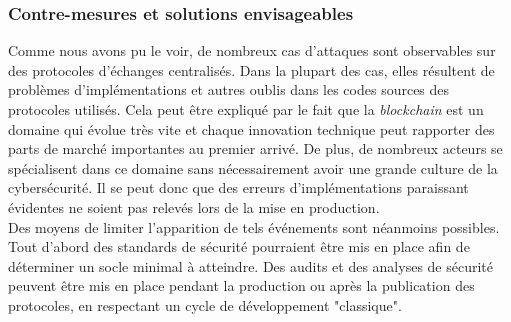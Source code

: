 \subsubsection{Contre-mesures et solutions envisageables}
Comme nous avons pu le voir, de nombreux cas d'attaques sont observables sur des protocoles d'échanges centralisés. 
Dans la plupart des cas, elles résultent de problèmes d'implémentations et autres oublis dans les codes sources des protocoles utilisés. 
Cela peut être expliqué par le fait que la \textit{\gls{blockchain}} est un domaine qui évolue très vite et chaque innovation technique peut rapporter des parts de marché importantes au premier arrivé. 
De plus, de nombreux acteurs se spécialisent dans ce domaine sans nécessairement avoir une grande culture de la cybersécurité.
Il se peut donc que des erreurs d'implémentations paraissant évidentes ne soient pas relevés lors de la mise en production. \\ 
Des moyens de limiter l'apparition de tels événements sont néanmoins possibles. 
Tout d'abord des standards de sécurité pourraient être mis en place afin de déterminer un socle minimal à atteindre. 
Des audits et des analyses de sécurité peuvent être mis en place pendant la production ou après la publication des protocoles, en respectant un cycle de développement "classique".
